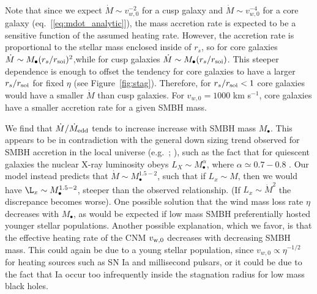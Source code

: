 \documentclass[usenatbib,fleqn]{mn2e}
\newcommand{\Mdot}{\dot{M}}
\newcommand{\rs}{r_s}
\newcommand{\Mbh}[1][]{M_{\bullet#1}}
\newcommand{\soi}{\rm soi}
\newcommand{\rsoi}{r_{\soi}}
\newcommand{\vwO}{v_{w,0}}
\begin{document}
Note that since we expect $\dot{M}\sim\vwO^{-2}$ for a cusp galaxy and $\dot{M}\sim\vwO^{-4}$ for a core galaxy (eq.~[\ref{eq:mdot_analytic}]), the mass accretion rate is expected to be a sensitive function of the assumed heating rate.  However,  the accretion rate is proportional to the stellar mass enclosed inside of $\rs$, so for core galaxies $\dot{M}\sim \Mbh (\rs/\rsoi)^{2}$,while for cusp galaxies $\dot{M}\sim \Mbh (\rs/\rsoi)$.  This steeper dependence is enough to offset the tendency for core galaxies to have a larger $\rs/\rsoi$ for fixed $\eta$ (see Figure~\ref{fig:stag}). Therefore, for $\rs/\rsoi<1$ core galaxies would have a smaller $\dot{M}$ than cusp galaxies.  For $\vwO=1000$ km s$^{-1}$, core galaxies have a smaller accretion rate for a given SMBH mass.

We find that $\dot{M}/\dot{M}_{\rm edd}$ tends to increase increase with SMBH mass $M_{\bullet}$.  This appears to be in contradiction with the general down sizing trend observed for SMBH accretion in the local universe (e.g.~\citealt{Heckman+04}; \citealt{Gallo+08}), such as the fact that for quiescent galaxies the nuclear X-ray luminosity obeys $L_X \sim \Mbh^\alpha$, where $\alpha\simeq 0.7-0.8$ \citep{MillerGallo+:2014a}.  Our model instead predicts that $\Mdot \sim
\Mbh^{1.5-2}$, such that if $L_x\sim M$, then we would have $\L_x \sim \Mbh^{1.5-2}$, steeper than the observed relationship. (If $L_x \sim \Mdot^2$ the discrepance becomes worse).  One possible solution that the wind mass loss rate $\eta$ decreases with $\Mbh$, as would be expected if low mass SMBH preferentially hosted younger stellar populations.  Another possible explanation, which we favor, is that the effective heating rate of the CNM $v_{\rm w,0}$ decreases with decreasing SMBH mass.  This could again be due to a young stellar population, since $v_{w,0} \propto \eta^{-1/2}$ for heating sources such as SN Ia and millisecond pulsars, or it could be due to the fact that Ia occur too infrequently inside the stagnation radius for low mass black holes.  
\end{document}
